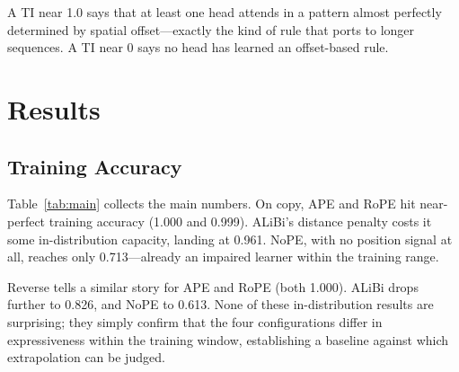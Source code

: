 \documentclass[10pt,twocolumn]{article}
\begin{document}
A TI near 1.0 says that at least one head attends in a pattern almost perfectly determined by spatial offset---exactly the kind of rule that ports to longer sequences.
A TI near 0 says no head has learned an offset-based rule.

\section{Results}
\label{sec:results}

\subsection{Training Accuracy}
\label{sec:indist}

Table~\ref{tab:main} collects the main numbers.
On copy, APE and RoPE hit near-perfect training accuracy (1.000 and 0.999).
ALiBi's distance penalty costs it some in-distribution capacity, landing at 0.961.
NoPE, with no position signal at all, reaches only 0.713---already an impaired learner within the training range.

Reverse tells a similar story for APE and RoPE (both 1.000).
ALiBi drops further to 0.826, and NoPE to 0.613.
None of these in-distribution results are surprising; they simply confirm that the four configurations differ in expressiveness within the training window, establishing a baseline against which extrapolation can be judged.
\end{document}

